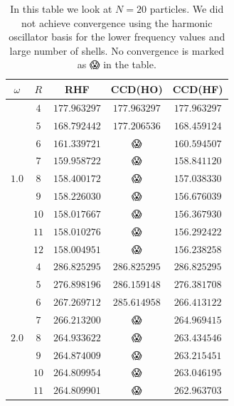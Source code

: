 \documentclass[
    a4paper, aps, twocolumn, floatfix, superscriptaddress,
    nofootinbib]{revtex4-1}
\newcommand{\nan}{{\DejaSans 😱}}
\newcommand{\1}{\mathds{1}}
\begin{document}
        \begin{table}
            \centering
            \caption{In this table we look at $N = 20$ particles.  We did not
            achieve convergence using the harmonic oscillator basis for the
            lower frequency values and large number of shells. No convergence is
            marked as {\nan} in the table.}
            \begin{ruledtabular}
                \begin{tabular}{c|c|ccc}
                    $\omega$ & $R$ & RHF & CCD(HO) & CCD(HF) \\
                    \hline
                          & $4$ & $177.963297$ & $177.963297$ & $177.963297$ \\
                          & $5$ & $168.792442$ & $177.206536$ & $168.459124$ \\
                          & $6$ & $161.339721$ & \nan & $160.594507$ \\
                          & $7$ & $159.958722$ & \nan & $158.841120$ \\
                    $1.0$ & $8$ & $158.400172$ & \nan & $157.038330$ \\
                          & $9$ & $158.226030$ & \nan & $156.676039$ \\
                          & $10$ & $158.017667$ & \nan & $156.367930$ \\
                          & $11$ & $158.010276$ & \nan & $156.292422$ \\
                          & $12$ & $158.004951$ & \nan & $156.238258$ \\
                    \hline
                          & $4$ & $286.825295$ & $286.825295$ & $286.825295$ \\
                          & $5$ & $276.898196$ & $286.159148$ & $276.381708$ \\
                          & $6$ & $267.269712$ & $285.614958$ & $266.413122$ \\
                          & $7$ & $266.213200$ & \nan & $264.969415$ \\
                    $2.0$ & $8$ & $264.933622$ & \nan & $263.434546$ \\
                          & $9$ & $264.874009$ & \nan & $263.215451$ \\
                          & $10$ & $264.809954$ & \nan & $263.046195$ \\
                          & $11$ & $264.809901$ & \nan & $262.963703$ \\

\end{tabular}
\end{ruledtabular}
\end{table}
\end{document}
